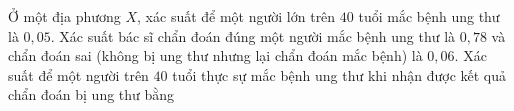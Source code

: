 \begin{ex}
Ở một địa phương $X$, xác suất để một người lớn trên $40$ tuổi mắc bệnh ung thư là $0{,}05$. Xác suất bác sĩ chẩn đoán đúng một người mắc bệnh ung thư là $0{,}78$ và chẩn đoán sai (không bị ung thư nhưng lại chẩn đoán mắc bệnh) là $0{,}06$. Xác suất để một người trên $40$ tuổi thực sự mắc bệnh ung thư khi nhận được kết quả chẩn đoán bị ung thư bằng
\end{ex}
